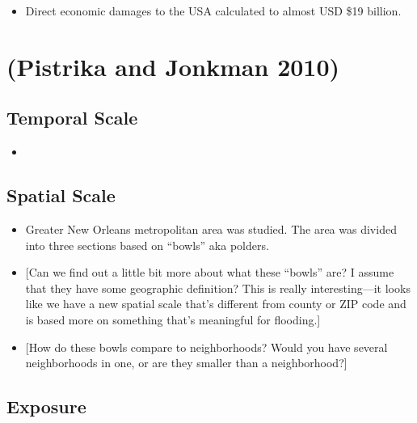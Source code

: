 \documentclass[
]{article}
\providecommand{\tightlist}{%
  \setlength{\itemsep}{0pt}\setlength{\parskip}{0pt}}
\begin{document}
\begin{itemize}
\tightlist
\item
  Direct economic damages to the USA calculated to almost USD \$19
  billion.
\end{itemize}

\hypertarget{pistrika2010damage}{%
\section{(Pistrika and Jonkman 2010)}\label{pistrika2010damage}}

\hypertarget{temporal-scale-22}{%
\subsection{Temporal Scale}\label{temporal-scale-22}}

\begin{itemize}
\item
\end{itemize}

\hypertarget{spatial-scale-22}{%
\subsection{Spatial Scale}\label{spatial-scale-22}}

\begin{itemize}
\tightlist
\item
  Greater New Orleans metropolitan area was studied. The area was
  divided into three sections based on ``bowls'' aka polders.
\item
  {[}Can we find out a little bit more about what these ``bowls'' are? I
  assume that they have some geographic definition? This is really
  interesting---it looks like we have a new spatial scale that's
  different from county or ZIP code and is based more on something
  that's meaningful for flooding.{]}
\item
  {[}How do these bowls compare to neighborhoods? Would you have several
  neighborhoods in one, or are they smaller than a neighborhood?{]}
\end{itemize}

\hypertarget{exposure-21}{%
\subsection{Exposure}\label{exposure-21}}
\end{document}
